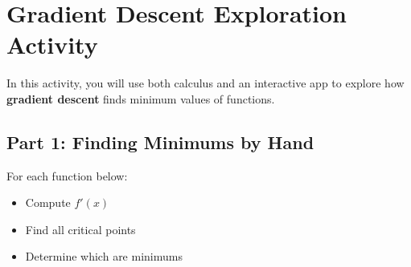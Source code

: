 \documentclass[11pt]{article}
\begin{document}
\section*{Gradient Descent Exploration Activity}

In this activity, you will use both calculus and an interactive app to explore how \textbf{gradient descent} finds minimum values of functions.

\subsection*{Part 1: Finding Minimums by Hand}

For each function below:

\begin{itemize}
    \item Compute $f'(x)$
    \item Find all critical points
    \item Determine which are minimums
\end{itemize}
\end{document}
